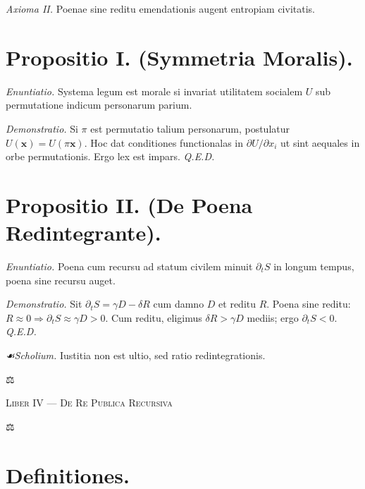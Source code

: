 \documentclass[12pt]{article}
\newcommand{\justitia}{\centerline{\Large ⚖}}
\newcommand{\scholia}{\textit{☙\;}}
\newcommand{\divider}{\vspace{1em}\justitia\vspace{1em}}
\newcommand{\Liber}[1]{\vspace{1ex}\begin{center}\Large\textsc{Liber #1}\end{center}\vspace{-0.5ex}\justitia\vspace{0.5ex}}
\begin{document}
\textit{Axioma II.} \; Poenae sine reditu emendationis augent entropiam civitatis.

\section*{Propositio I. \; (Symmetria Moralis).}

\textit{Enuntiatio.} \; Systema legum est morale si invariat utilitatem socialem \(U\) sub permutatione indicum personarum parium.

\textit{Demonstratio.} Si \(\pi\) est permutatio talium personarum, postulatur \(U(\mathbf{x})=U(\pi\mathbf{x})\). Hoc dat conditiones functionalas in \(\partial U/\partial x_i\) ut sint aequales in orbe permutationis. Ergo lex est impars. \textit{Q.E.D.}

\begin{center}
\end{center}

\section*{Propositio II. \; (De Poena Redintegrante).}

\textit{Enuntiatio.} \; Poena cum recursu ad statum civilem minuit \(\partial_t S\) in longum tempus, poena sine recursu auget.

\textit{Demonstratio.} Sit \(\partial_t S = \gamma D - \delta R\) cum damno \(D\) et reditu \(R\). Poena sine reditu: \(R\approx 0\Rightarrow \partial_t S \approx \gamma D > 0\). Cum reditu, eligimus \(\delta R > \gamma D\) mediis; ergo \(\partial_t S<0\). \textit{Q.E.D.}

\textit{\scholia Scholium.} Iustitia non est ultio, sed ratio redintegrationis.

\divider

\Liber{IV — De Re Publica Recursiva}

\section*{Definitiones.}
\end{document}
